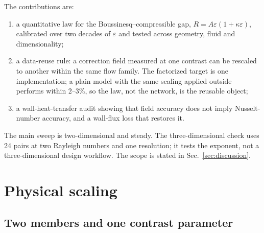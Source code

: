 \documentclass[preprint,11pt,a4paper,times,doubleblind]{elsarticle}
\begin{document}
The contributions are:
\begin{enumerate}
\item a quantitative law for the Boussinesq--compressible gap,
$R=A\varepsilon(1+\kappa\varepsilon)$, calibrated over two decades of $\varepsilon$ and tested
across geometry, fluid and dimensionality;
\item a data-reuse rule: a correction field measured at one contrast can be rescaled to
another within the same flow family. The factorized target is one implementation; a plain
model with the same scaling applied outside performs within 2--3\%, so the law, not the
network, is the reusable object;
\item a wall-heat-transfer audit showing that field accuracy does not imply Nusselt-number
accuracy, and a wall-flux loss that restores it.
\end{enumerate}

The main sweep is two-dimensional and steady. The three-dimensional check uses 24 pairs at two
Rayleigh numbers and one resolution; it tests the exponent, not a three-dimensional design
workflow. The scope is stated in Sec.~\ref{sec:discussion}.

\section{Physical scaling}
\label{sec:theory}

\subsection{Two members and one contrast parameter}
\end{document}
